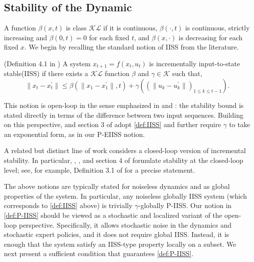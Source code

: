 \documentclass{article}
\begin{document}
\subsection{Stability of the Dynamic}\label{sec:discussion-on_PIISS}

A function $\beta(x, t)$ is class $\mathcal{K}\mathcal L$ if it is continuous, $\beta(\cdot, t)$ is continuous, strictly increasing and $\beta(0, t)=0$ for each fixed $t$, and $\beta(x,\cdot)$ is decreasing for each fixed $x$. We begin by recalling the standard notion of IISS from the literature.

\begin{definition}(\textnormal{Definition 4.1 in \citep{angeli2002lyapunov})}\label{def:IISS}
    A system $x_{t+1}=f(x_t, u_t)$ is incrementally input-to-state stable(IISS) if there exists a $\mathcal K\mathcal L$ function $\beta$ and $\gamma\in \mathcal K$ such that,
    \begin{equation*}
        \|x_t-x_t^\prime\|\leq \beta(\|x_1-x_1^\prime\|,t)+\gamma\left((\|u_k-u_k^\prime\|)_{1\leq k\leq t-1}\right).
    \end{equation*}
\end{definition}

This notion is open-loop in the sense emphasized in \citet{simchowitz2025pitfalls} and \citet{zhang2025imitation}: the stability bound is stated directly in terms of the difference between two input sequences. Building on this perspective, \citet{simchowitz2025pitfalls} and section 3 of \citet{zhang2025imitation} adopt \cref{def:IISS} and further require $\gamma$ to take an exponential form, as in our P-EIISS notion.

A related but distinct line of work considers a closed-loop version of incremental stability. In particular, \citet{pfrommer2022tasil}, \citet{block2023provable}, and section 4 of \citet{zhang2025imitation} formulate stability at the closed-loop level; see, for example, Definition 3.1 of \citet{pfrommer2022tasil} for a precise statement.

The above notions are typically stated for noiseless dynamics and as global properties of the system. In particular, any noiseless globally IISS system (which corresponds to \cref{def:IISS} above) is trivially $\gamma$-globally P-IISS. Our notion in \cref{def:P-IISS} should be viewed as a stochastic and localized variant of the open-loop perspective. Specifically, it allows stochastic noise in the dynamics and stochastic expert policies, and it does not require global IISS. Instead, it is enough that the system satisfy an IISS-type property locally on a subset. We next present a sufficient condition that guarantees \cref{def:P-IISS}.
 
\end{document}
